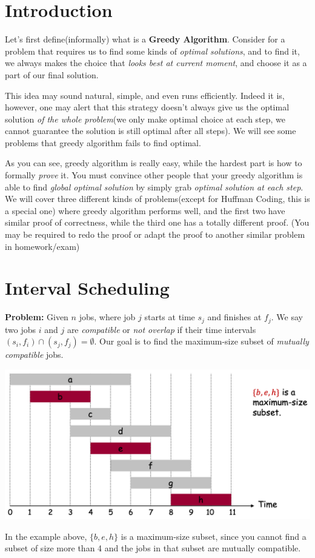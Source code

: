 \begin{spacing}{1.3}

    \section{Introduction}

    Let's first define(informally) what is a {\bf Greedy Algorithm}. Consider for a problem 
    that requires us to find some kinds of {\it optimal solutions}, and to find it, 
    we always makes the choice that {\it looks best at current moment}, and choose it as 
    a part of our final solution.

    This idea may sound natural, simple, and even runs efficiently. Indeed it is, however, 
    one may alert that this strategy doesn't always give us the optimal solution 
    {\it of the whole problem}(we only make optimal choice at each step, we cannot guarantee 
    the solution is still optimal after all steps). We will see some problems that greedy 
    algorithm fails to find optimal.

    As you can see, greedy algorithm is really easy, while the hardest part is how to formally
    {\it prove} it. You must convince other people that your greedy algorithm is able to 
    find {\it global optimal solution} by simply grab {\it optimal solution at each step}.
    We will cover three different kinds of problems(except for Huffman Coding, this is a special one) 
    where greedy algorithm performs well, and the first two have similar proof of correctness,
    while the third one has a totally different proof.
    (You may be required to redo the proof or adapt the proof to another similar 
    problem in homework/exam)


    \section{Interval Scheduling}

    {\bf Problem:} Given $n$ jobs, where job $j$ starts at time $s_j$ and finishes at $f_j$.
    We say two jobs $i$ and $j$ are {\it compatible} or {\it not overlap} if their time intervals 
    $(s_i, f_i)\cap (s_j, f_j) = \emptyset$. Our goal is to find the maximum-size subset
    of {\it mutually compatible} jobs.
    \begin{center}
        \includegraphics[scale=0.35]{images/07-interval-example.png}
    \end{center}
    In the example above, $\{b,e,h\}$ is a maximum-size subset, since you cannot find 
    a subset of size more than 4 and the jobs in that subset are mutually compatible.


\end{spacing}
